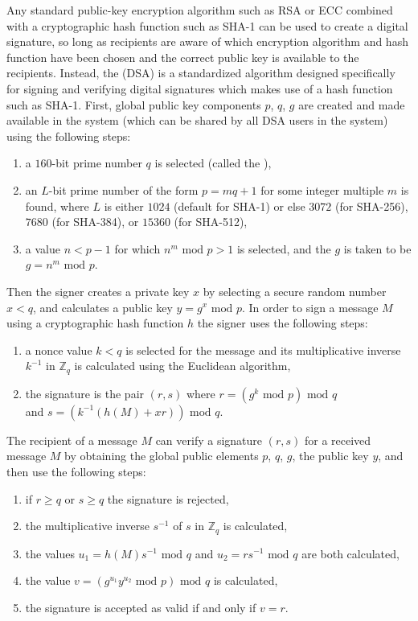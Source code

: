 Any standard public-key encryption algorithm such as RSA or ECC combined with
a cryptographic hash function such as SHA-1 can be used to create a digital signature,
so long as recipients are aware of which encryption algorithm and hash function
have been chosen and the correct public key is available to the recipients.
Instead, the  (DSA) is a standardized algorithm
designed specifically for signing and verifying digital signatures which makes
use of a hash function such as SHA-1.
First, global public key components $p$, $q$, $g$ are created and made available
in the system (which can be shared by all DSA users in the system) using the following steps:
\begin{enumerate}
  \item a $160$-bit prime number $q$ is selected (called the ),
  \item an $L$-bit prime number of the form $p=mq+1$ for some integer multiple $m$ is found,
  where $L$ is either $1024$ (default for SHA-1) or else $3072$ (for SHA-256),
  $7680$ (for SHA-384), or $15360$ (for SHA-512),
  \item a value $n<p-1$ for which $n^m\mbox{ mod }p > 1$ is selected,
  and the  $g$ is taken to be $g=n^m\mbox{ mod }p$.
\end{enumerate}
Then the signer creates a private key $x$ by selecting a secure random number $x<q$,
and calculates a public key $y=g^x\mbox{ mod }p$.
In order to sign a message $M$ using a cryptographic hash function $h$ the signer
uses the following steps:
\begin{enumerate}
  \item a nonce value $k<q$ is selected for the message and its multiplicative inverse
  $k^{-1}$ in $\mathbb{Z}_q$ is calculated using the Euclidean algorithm,
  \item the signature is the pair $(r,s)$ where $r=\left(g^k\mbox{ mod }p\right)\textrm{ mod }q$\\ and $s=\left(k^{-1}\left(h(M)+xr\right)\right)\mbox{ mod }q$.
\end{enumerate}
The recipient of a message $M$ can verify a signature $(r,s)$ for a received message $M$ by
obtaining the global public elements $p$, $q$, $g$, the public key $y$, and then use
the following steps:
\begin{enumerate}
  \item if $r\geq q$ or $s\geq q$ the signature is rejected,
  \item the multiplicative inverse $s^{-1}$ of $s$ in $\mathbb{Z}_q$ is calculated,
  \item the values $u_1=h(M)s^{-1}\mbox{ mod }q$ and $u_2=rs^{-1}\mbox{ mod }q$ are both calculated,
  \item the value $v=\left(g^{u_1}y^{u_2}\mbox{ mod }p\right)\mbox{ mod }q$ is calculated,
  \item the signature is accepted as valid if and only if $v=r$.
\end{enumerate}
